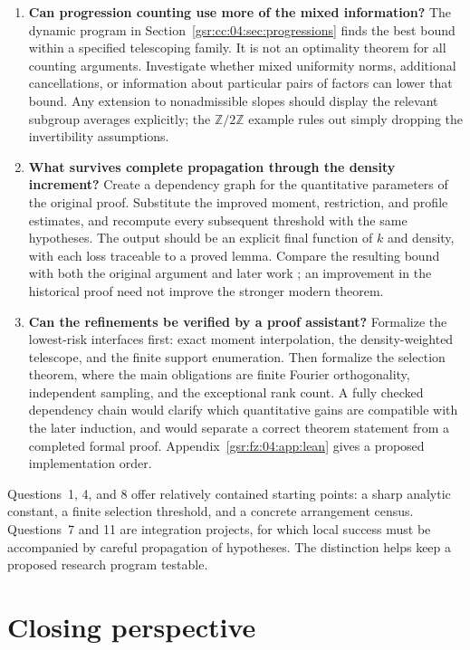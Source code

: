 \documentclass[11pt,letterpaper]{article}
\numberwithin{equation}{section}
\theoremstyle{definition}
\theoremstyle{remark}
\newcommand{\1}{\mathbf 1}
\newcommand{\srctag}[1]{\texorpdfstring{\enspace\textup{[#1]}}{ [#1]}}
\newcommand{\srcnote}[2]{\par\noindent{\small\textit{Source #1, delivered #2.}}\par}
\begin{document}
\begin{enumerate}[label=\textbf{Q\arabic*.},leftmargin=2.6em,resume]
\item \textbf{Can progression counting use more of the mixed information?}
The dynamic program in Section~\ref{gsr:cc:04:sec:progressions} finds the best
bound within a specified telescoping family.  It is not an optimality
theorem for all counting arguments.  Investigate whether mixed
uniformity norms, additional cancellations, or information about
particular pairs of factors can lower that bound.  Any extension to
nonadmissible slopes should display the relevant subgroup averages
explicitly; the \(\mathbb Z/2\mathbb Z\) example rules out simply
dropping the invertibility assumptions.

\item \textbf{What survives complete propagation through the density increment?}
Create a dependency graph for the quantitative parameters of the
original proof.  Substitute the improved moment, restriction, and
profile estimates, and recompute every subsequent threshold with the
same hypotheses.  The output should be an explicit final function of
\(k\) and density, with each loss traceable to a proved lemma.
Compare the resulting bound with both the original argument and
later work \cite{lssbounds,lssinverse}; an improvement in the
historical proof need not improve the stronger modern theorem.

\item \textbf{Can the refinements be verified by a proof assistant?}
Formalize the lowest-risk interfaces first: exact moment interpolation,
the density-weighted telescope, and the finite support enumeration.
Then formalize the selection theorem, where the main obligations are
finite Fourier orthogonality, independent sampling, and the exceptional
rank count.  A fully checked dependency chain would clarify which
quantitative gains are compatible with the later induction, and would
separate a correct theorem statement from a completed formal proof.
Appendix~\ref{gsr:fz:04:app:lean} gives a proposed implementation order.
\end{enumerate}

Questions~1, 4, and 8 offer relatively contained starting points: a sharp
analytic constant, a finite selection threshold, and a concrete
arrangement census.  Questions~7 and 11 are integration projects, for
which local success must be accompanied by careful propagation of
hypotheses.  The distinction helps keep a proposed research program
testable.

\section[{Closing perspective\srctag{04}}]{Closing perspective}\label{gsr:fz:04:sec:d11}
\srcnote{04}{Section 11}
\end{document}
